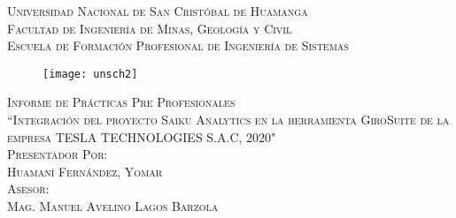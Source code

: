 \newcommand{\mydate}{\formatdate{02}{12}{2020}}
\begin{titlepage}
	\begin{center}
		\textsc{ 
		\Large Universidad Nacional de San Cristóbal de Huamanga\\
		\vspace{5mm}
			Facultad de Ingeniería de Minas, Geología y Civil\\
		\vspace{5mm}
		Escuela de Formación Profesional de Ingeniería de Sistemas\\}
	
			\begin{figure}[h]
				\centering
				\texttt{[image: unsch2]}
			\end{figure}
		
		\textsc{ 
			\large Informe de Prácticas Pre Profesionales\\
			\vspace{5mm}
				``Integración del proyecto Saiku Analytics en la herramienta GiroSuite de la empresa TESLA TECHNOLOGIES S.A.C, 2020"\\
			\vspace{1cm}
			Presentador Por:\\
			Huamaní Fernández, Yomar\\	
			\vspace{5mm}
			Asesor:\\
			Mag. Manuel Avelino Lagos Barzola\\
			\vspace{5mm}
			\mydate
		}
	\end{center}
\end{titlepage}